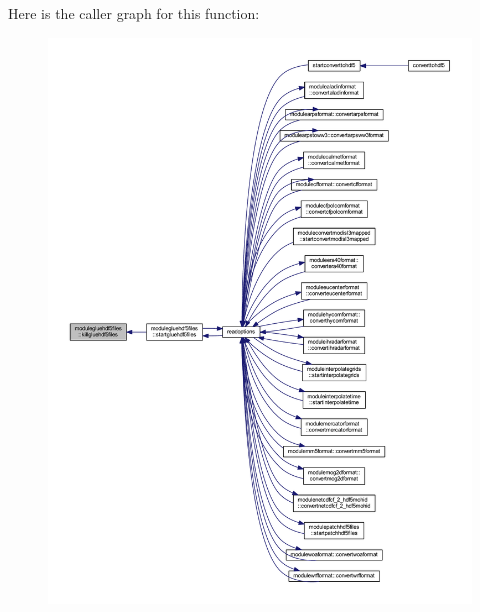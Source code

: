 Here is the caller graph for this function\+:\nopagebreak
\begin{figure}[H]
\begin{center}
\leavevmode
\includegraphics[width=350pt]{namespacemodulegluehdf5files_a07002430e2da49aa4ce7da8244ca8dbd_icgraph}
\end{center}
\end{figure}
\mbox{\label{namespacemodulegluehdf5files_a2b70cc6d35be5763a50ac4153fb03cc5}} 
